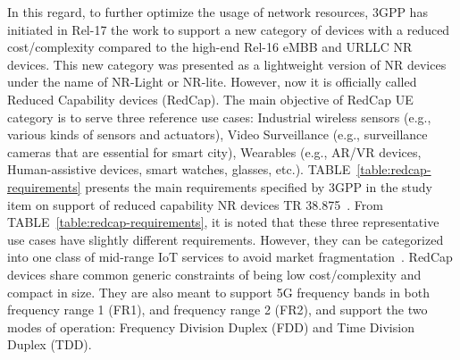 \documentclass[]{IEEEtran}
\begin{document}
In this regard, to further optimize the usage of network resources, 3GPP has initiated in Rel-17 the work to support a new category of devices with a reduced cost/complexity compared to the high-end Rel-16 eMBB and URLLC NR devices.
This new category was presented as a lightweight version of NR devices under the name of NR-Light or NR-lite.
However, now it is officially called Reduced Capability devices (RedCap).
The main objective of RedCap UE category is to serve three reference use cases: Industrial wireless sensors (e.g., various kinds of sensors and actuators), Video Surveillance (e.g., surveillance cameras that are essential for smart city), Wearables (e.g., AR/VR devices, Human-assistive devices, smart watches, glasses,  etc.).
TABLE~\ref{table:redcap-requirements} presents the main requirements specified by 3GPP in the study item on support of reduced capability NR devices TR 38.875~\cite{3gpp_study_2021_38.875}.
From TABLE~\ref{table:redcap-requirements}, it is noted that these three representative use cases have slightly different requirements.
However, they can be categorized into one class of mid-range IoT services to avoid market fragmentation~\cite{3gpp_framework_2020_R2-2009618}.
RedCap devices share common generic constraints of being low cost/complexity and compact in size.
They are also meant to support 5G frequency bands in both frequency range 1 (FR1), and frequency range 2 (FR2), and support the two modes of operation: Frequency Division Duplex (FDD) and Time Division Duplex (TDD).
\end{document}
